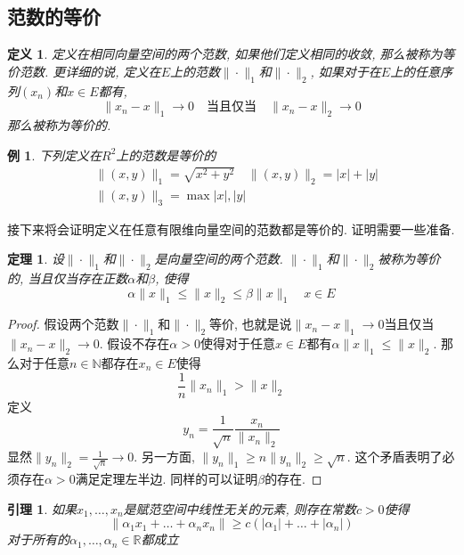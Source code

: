 \documentclass[a4paper,11pt]{book}
\newtheorem{definition}{\hspace{2em}定义}[section]
\newtheorem{theorem}{\hspace{2em}定理}[section]
\newtheorem{lemma}{\hspace{2em}引理}[section]
\newtheorem{proof}{证明}[section]
\newtheorem{example}{例}[section]
\begin{document}
\subsection*{范数的等价}
\begin{definition}
  定义在相同向量空间的两个范数, 如果他们定义相同的收敛, 那么被称为等价范数. 更详细的说, 定义在$E$上的范数$\|\cdot\|_1$和$\|\cdot\|_2$, 如果对于在$E$上的任意序列$(x_n)$和$x\in E$都有,
  \begin{equation*}
    \|x_n-x\|_1\to 0 \quad \text{当且仅当}\quad \|x_n-x\|_2\to 0
  \end{equation*}
  那么被称为等价的.
\end{definition}
\begin{example}
  下列定义在$R^2$上的范数是等价的
  \begin{equation*}
  \begin{split}
       &\|(x,y)\|_1=\sqrt{x^2+y^2}\quad \|(x,y)\|_2=|x|+|y| \\
       &\|(x,y)\|_3=\max{|x|,|y|}
  \end{split}
  \end{equation*}
\end{example}
接下来将会证明定义在任意有限维向量空间的范数都是等价的. 证明需要一些准备.
\begin{theorem}\label{norm equivalence}
  设$\|\cdot\|_1$和$\|\cdot\|_2$是向量空间的两个范数. $\|\cdot\|_1$和$\|\cdot\|_2$被称为等价的, 当且仅当存在正数$\alpha$和$\beta$, 使得
  \begin{equation*}
    \alpha\|x\|_1\leq\|x\|_2\leq\beta\|x\|_1\quad x\in E
  \end{equation*}
\end{theorem}
\begin{proof}
  假设两个范数$\|\cdot\|_1$和$\|\cdot\|_2$等价, 也就是说$\|x_n-x\|_1\to 0$当且仅当$\|x_n-x\|_2\to 0$. 假设不存在$\alpha>0$使得对于任意$x\in E$都有$\alpha\|x\|_1\leq\|x\|_2$. 那么对于任意$n\in \mathbb{N}$都存在$x_n\in E$使得
  \begin{equation*}
    \frac{1}{n}\|x_n\|_1>\|x\|_2
  \end{equation*}
  定义
  \begin{equation*}
    y_n=\frac{1}{\sqrt{n}}\frac{x_n}{\|x_n\|_2}
  \end{equation*}
  显然$\|y_n\|_2=\frac{1}{\sqrt{n}}\to 0$. 另一方面, $\|y_n\|_1\geq n\|y_n\|_2\geq \sqrt{n}$. 这个矛盾表明了必须存在$\alpha>0$满足定理左半边. 同样的可以证明$\beta$的存在.
\end{proof}
\begin{lemma}\label{norm Lemma}
  如果$x_1,\dots,x_n$是赋范空间中线性无关的元素, 则存在常数$c>0$使得
  \begin{equation}\label{norm lemma}
    \|\alpha_1x_1+\dots+\alpha_nx_n\|\geq c(|\alpha_1|+\dots+|\alpha_n|)
  \end{equation}
  对于所有的$\alpha_1,\dots,\alpha_n\in\mathbb{R}$都成立
\end{lemma}
\end{document}
